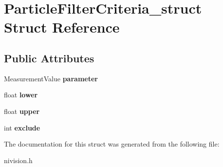 \hypertarget{structParticleFilterCriteria__struct}{\section{\-Particle\-Filter\-Criteria\-\_\-struct \-Struct \-Reference}
\label{structParticleFilterCriteria__struct}
}
\subsection*{\-Public \-Attributes}
\begin{DoxyCompactItemize}
\item 
\hypertarget{structParticleFilterCriteria__struct_ab8525522c37ff88e7e06bce0835ea0cd}{\-Measurement\-Value {\bfseries parameter}}\label{structParticleFilterCriteria__struct_ab8525522c37ff88e7e06bce0835ea0cd}

\item 
\hypertarget{structParticleFilterCriteria__struct_a6bb0949cb2db3b1dd09719a6fc025744}{float {\bfseries lower}}\label{structParticleFilterCriteria__struct_a6bb0949cb2db3b1dd09719a6fc025744}

\item 
\hypertarget{structParticleFilterCriteria__struct_ae5d5a5091f6422e525fd0cc1eed5f3bd}{float {\bfseries upper}}\label{structParticleFilterCriteria__struct_ae5d5a5091f6422e525fd0cc1eed5f3bd}

\item 
\hypertarget{structParticleFilterCriteria__struct_a114fda1577f77404f72621abe8f77d84}{int {\bfseries exclude}}\label{structParticleFilterCriteria__struct_a114fda1577f77404f72621abe8f77d84}

\end{DoxyCompactItemize}


\-The documentation for this struct was generated from the following file\-:\begin{DoxyCompactItemize}
\item 
nivision.\-h\end{DoxyCompactItemize}
